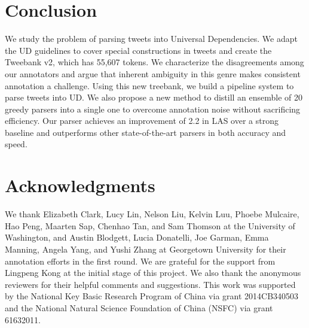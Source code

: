 \documentclass[11pt,a4paper]{article}
\begin{document}
\section{Conclusion}
We study the problem of parsing tweets into Universal Dependencies.
We adapt the UD guidelines to cover 
special constructions in tweets and create
the {\sc Tweebank v2}, which has 55,607 tokens. We characterize the disagreements
among our annotators and argue that inherent ambiguity in this genre
makes
consistent annotation a challenge.  Using this new treebank,
we build a pipeline system to parse tweets into UD. We also 
propose a new method to distill an ensemble of 20 greedy parsers into a single one
to overcome annotation noise without sacrificing efficiency.
Our parser achieves an improvement of 2.2  in LAS over a strong baseline
and outperforms other state-of-the-art parsers in both accuracy and speed.

\section*{Acknowledgments}
We thank Elizabeth Clark, Lucy Lin, Nelson Liu, Kelvin Luu, Phoebe Mulcaire, 
Hao Peng, Maarten Sap, Chenhao Tan, and Sam Thomson at the University of Washington, 
and Austin Blodgett, Lucia Donatelli, Joe Garman, Emma Manning, Angela Yang, and Yushi Zhang 
at Georgetown University for their annotation efforts in the first round.
We are grateful for the support from Lingpeng Kong at the initial stage of this project.
We also thank the anonymous reviewers for their helpful comments and suggestions.
This work was supported by the National Key Basic Research
Program of China via grant 2014CB340503 and the
National Natural Science Foundation of China (NSFC) via
grant 61632011.
\end{document}
